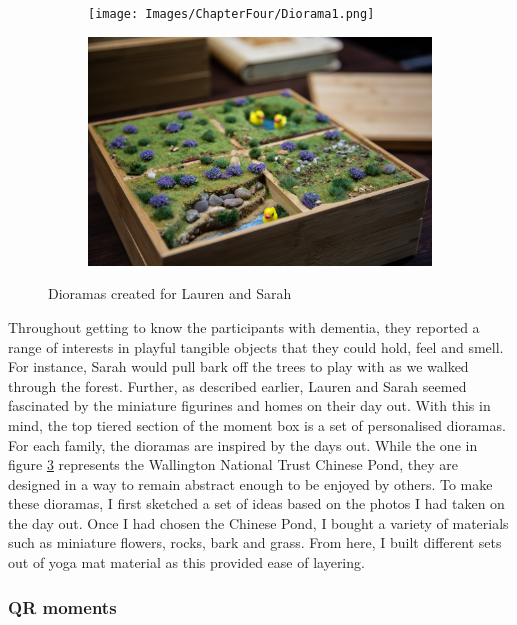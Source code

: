 \begin{figure}[htp]
\centering
\begin{subfigure}{.5\textwidth}
  \centering
  \texttt{[image: Images/ChapterFour/Diorama1.png]}
  \label{fig:DiroamaOne}
\end{subfigure}%
\begin{subfigure}{.5\textwidth}
  \centering
  \includegraphics[width=.8\linewidth]{Images/ChapterFour/Diroama2.png}
  \label{fig:DiroamaTwo}
\end{subfigure}
\caption{Dioramas created for Lauren and Sarah}
\label{fig:Dioramas}
\end{figure}

Throughout getting to know the participants with dementia, they reported a range of interests in playful tangible objects that they could hold, feel and smell. For instance, Sarah would pull bark off the trees to play with as we walked through the forest. Further, as described earlier, Lauren and Sarah seemed fascinated by the miniature figurines and homes on their day out. With this in mind, the top tiered section of the moment box is a set of personalised dioramas. For each family, the dioramas are inspired by the days out. While the one in figure \ref{fig:Dioramas} represents the Wallington National Trust Chinese Pond, they are designed in a way to remain abstract enough to be enjoyed by others. To make these dioramas, I first sketched a set of ideas based on the photos I had taken on the day out. Once I had chosen the Chinese Pond, I bought a variety of materials such as miniature flowers, rocks, bark and grass. From here, I built different sets out of yoga mat material as this provided ease of layering.

\subsubsection{QR moments}
\label{QR-Code-Moments}

